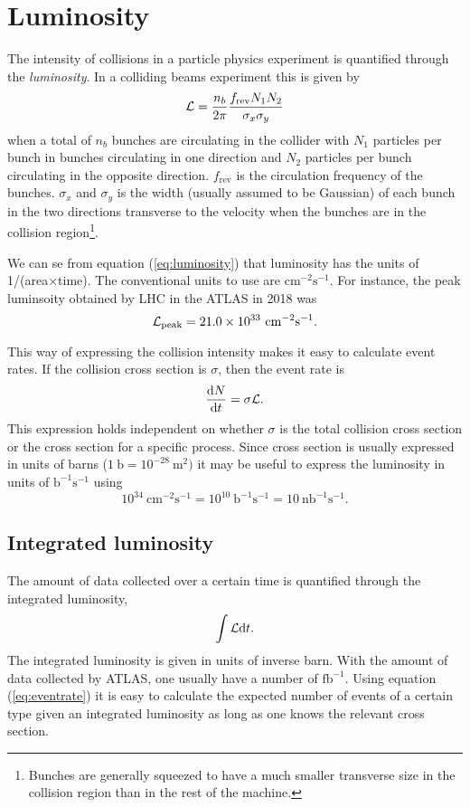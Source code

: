 \section{Luminosity}

The intensity of collisions in a particle physics experiment is quantified through the \emph{luminosity}. In a colliding beams experiment this is given by
\begin{equation}
\label{eq:luminosity}
{\cal L} = \frac{n_b}{2\pi}\frac{f_\text{rev}N_1 N_2}{\sigma_x \sigma_y}
\end{equation}
when a total of $n_b$ bunches are circulating in the collider with $N_1$ particles per bunch in bunches circulating in one direction and $N_2$ particles per bunch circulating in the opposite direction. $f_\text{rev}$ is the circulation frequency of the bunches. $\sigma_x$ and $\sigma_y$ is the width (usually assumed to be Gaussian) of each bunch in the two directions transverse to the velocity when the bunches are in the collision region\footnote{Bunches are generally squeezed to have a much smaller transverse size in the collision region than in the rest of the machine.}.

We can se from equation (\ref{eq:luminosity}) that luminosity has the units of 1/(area$\times$time). The conventional units to use are $\mathrm{cm^{-2}s^{-1}}$. For instance, the peak luminsoity obtained by LHC in the ATLAS in 2018 was
\begin{displaymath}
	{\cal L}_\text{peak} = 21.0\times 10^{33}~\mathrm{cm^{-2}s^{-1}}.
\end{displaymath}

This way of expressing the collision intensity makes it easy to calculate event rates. If the collision cross section is $\sigma$, then the event rate is
\begin{equation}
\label{eq:eventrate}
	\frac{\text{d} N}{\text{d} t} = \sigma {\cal L}.
\end{equation}
This expression holds independent on whether $\sigma$ is the total collision cross section or the cross section for a specific process. Since cross section is usually expressed in units of barns ($1~\mathrm{b}=10^{-28}~\mathrm{m^2})$ it may be useful to express the luminosity in units of $\mathrm{b^{-1}s^{-1}}$ using
\begin{displaymath}
	10^{34}~\mathrm{cm^{-2}s^{-1}} = 10^{10}~\mathrm{b^{-1}s^{-1}} = 10~\mathrm{nb^{-1}s^{-1}}.
\end{displaymath}

\subsection{Integrated luminosity}
The amount of data collected over a certain time is quantified through the integrated luminosity,
\begin{equation}
	\int {\cal L}\text{d} t.
\end{equation}
The integrated luminosity is given in units of inverse barn. With the amount of data collected by ATLAS, one usually have a number of $\mathrm{fb}^{-1}$. Using equation (\ref{eq:eventrate}) it is easy to calculate the expected number of events of a certain type given an integrated luminosity as long as one knows the relevant cross section. 